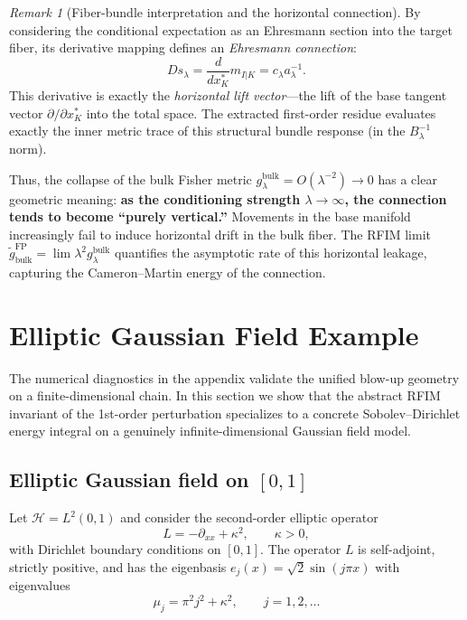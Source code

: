 \documentclass[11pt]{amsart}
\theoremstyle{plain}
\theoremstyle{definition}
\theoremstyle{remark}
\newtheorem{remark}[theorem]{Remark}
\begin{document}
    \begin{remark}[Fiber-bundle interpretation and the horizontal connection]
        \label{rem:fiber_bundle_connection}
        By considering the conditional expectation as an Ehresmann section into the target fiber, its derivative mapping defines an \emph{Ehresmann connection}:
        \begin{equation}
            Ds_\lambda = \frac{d}{dx_K^*} m_{I|K} = c_\lambda a_\lambda^{-1}.
        \end{equation}
        This derivative is exactly the \emph{horizontal lift vector}---the lift of the base tangent vector $\partial/\partial x_K^*$ into the total space. The extracted first-order residue evaluates exactly the inner metric trace of this structural bundle response (in the $B_\lambda^{-1}$ norm). 

        Thus, the collapse of the bulk Fisher metric $g_\lambda^{\mathrm{bulk}} = O(\lambda^{-2}) \to 0$ has a clear geometric meaning: \textbf{as the conditioning strength $\lambda \to \infty$, the connection tends to become ``purely vertical.''} Movements in the base manifold increasingly fail to induce horizontal drift in the bulk fiber. The RFIM limit $\widetilde{g}_{\mathrm{bulk}}^{\mathrm{FP}} = \lim \lambda^2 g_\lambda^{\mathrm{bulk}}$ quantifies the asymptotic rate of this horizontal leakage, capturing the Cameron--Martin energy of the connection.
    \end{remark}




    \section{Elliptic Gaussian Field Example}
    \label{sec:spde}

    The numerical diagnostics in the appendix validate the unified blow-up geometry on a finite-dimensional chain. In this section we show that the abstract RFIM invariant of the 1st-order perturbation specializes to a concrete Sobolev--Dirichlet energy integral on a genuinely infinite-dimensional Gaussian field model.

    \subsection{Elliptic Gaussian field on $[0,1]$}
    \label{sec:spde:setup}

    Let $\mathcal{H} = L^2(0,1)$ and consider the second-order elliptic operator
    \[
    L = -\partial_{xx} + \kappa^2, \qquad \kappa > 0,
    \]
    with Dirichlet boundary conditions on $[0,1]$. The operator $L$ is self-adjoint, strictly positive, and has the eigenbasis $e_j(x) = \sqrt{2}\sin(j\pi x)$ with eigenvalues
    \[
    \mu_j = \pi^2 j^2 + \kappa^2, \qquad j = 1, 2, \dots
    \]
\end{document}
